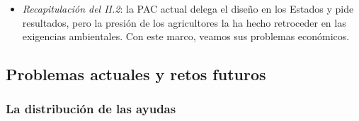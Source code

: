 \documentclass[11pt]{article}
\begin{document}
\begin{itemize}
\item \emph{Recapitulación del II.2}: la PAC actual delega el diseño en los Estados y pide resultados, pero la presión de los agricultores la ha hecho retroceder en las exigencias ambientales. Con este marco, veamos sus problemas económicos.
\end{itemize}

\subsection{Problemas actuales y retos futuros}\label{sec:problemas}

\subsubsection{La distribución de las ayudas}\label{sec:distribucion}
\end{document}
